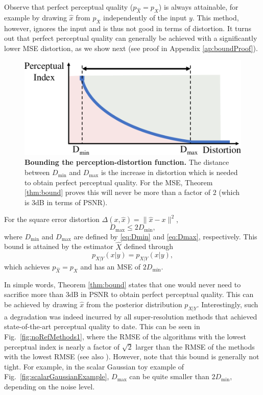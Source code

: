 Observe that perfect perceptual quality ($p_{\hat{X}} = p_X$) is always attainable, for example by drawing $\hat{x}$ from $p_X$ independently of the input $y$. 
This method, however, ignores the input and is thus not good in terms of distortion. 
It turns out that perfect perceptual quality can generally be achieved with a significantly lower MSE distortion, as we show next  (see proof in Appendix \ref{ap:boundProof}).

\begin{figure}
	\begin{center}
		\includegraphics[width=0.85\linewidth]{figures/minMaxDist.pdf}
	\end{center}
	\caption{\textbf{Bounding the perception-distortion function.} The distance between $D_{\min}$ and $D_{\max}$ is the increase in distortion which is needed to obtain perfect perceptual quality. For the MSE, Theorem \ref{thm:bound} proves this will never be more than a factor of $2$ (which is $3$dB in terms of PSNR).}
	\label{fig:minMaxDist}
\end{figure}

\begin{theorem}\label{thm:bound}
	For the square error distortion $\Delta(x,\hat{x}) = \|\hat{x}-x\|^2$,
	\begin{equation}
	D_{\max}\leq 2D_{\min},
	\end{equation}	
	where $D_{\min}$ and $D_{\max}$ are defined by \eqref{eq:Dmin} and \eqref{eq:Dmax}, respectively. This bound is attained by the estimator $\hat{X}$ defined through
\begin{equation}\label{eq:xpost}
p_{\hat{X}|Y}(x|y) = p_{X|Y}(x|y),
\end{equation}
which achieves $p_{\hat{X}}=p_X$ and has an MSE of $2D_{\min}$.
\end{theorem}

In simple words, Theorem \ref{thm:bound} states that one would never need to sacrifice more than $3$dB in PSNR to obtain perfect perceptual quality. This can be achieved by drawing $\hat{x}$ from the posterior distribution $p_{X|Y}$. Interestingly, such a degradation was indeed incurred by all super-resolution methods that achieved state-of-the-art perceptual quality to date. This can be seen in Fig.~\ref{fig:noRefMethods1}, where the RMSE of the algorithms with the lowest perceptual index is nearly a factor of $\sqrt{2}$ larger than the RMSE of the methods with the lowest RMSE (see also \cite{ledig2016photo,sajjadi2017enhancenet}). However, note that this bound is generally not tight. For example, in the scalar Gaussian toy example of Fig.~\ref{fig:scalarGaussianExample}, $D_{\max}$ can be quite smaller than $2D_{\min}$, depending on the noise level.


